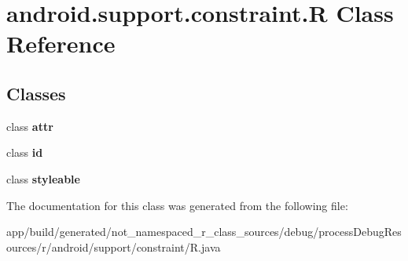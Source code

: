 \hypertarget{classandroid_1_1support_1_1constraint_1_1_r}{}\section{android.\+support.\+constraint.\+R Class Reference}
\label{classandroid_1_1support_1_1constraint_1_1_r}
\subsection*{Classes}
\begin{DoxyCompactItemize}
\item 
class {\bfseries attr}
\item 
class {\bfseries id}
\item 
class {\bfseries styleable}
\end{DoxyCompactItemize}


The documentation for this class was generated from the following file\+:\begin{DoxyCompactItemize}
\item 
app/build/generated/not\+\_\+namespaced\+\_\+r\+\_\+class\+\_\+sources/debug/process\+Debug\+Resources/r/android/support/constraint/R.\+java\end{DoxyCompactItemize}
